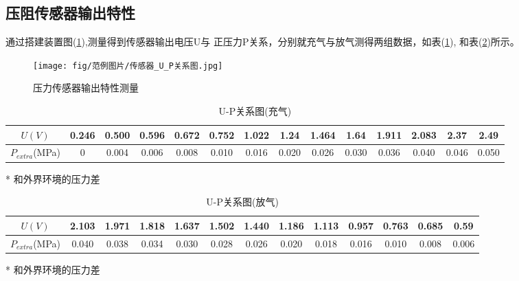 \documentclass[a4paper,UTF8]{ctexart}
\begin{document}
\subsection*{压阻传感器输出特性}
    通过搭建装置图(\ref*{fig:8}),测量得到传感器输出电压U与
正压力P关系，分别就充气与放气测得两组数据，如表(\ref*{table:4}),
和表(\ref*{table:5})所示。
\begin{figure}[!hp]
    \centering
    \texttt{[image: fig/范例图片/传感器\_U\_P关系图.jpg]}
    \caption{压力传感器输出特性测量}
    \label{fig:8}
\end{figure}
\begin{table}[!hp]
    \begin{center}
        \begin{threeparttable}
            \caption{U-P关系图(充气)}
            \begin{tabular}{|c|c|c|c|c|c|c|c|c|c|c|c|c|c|}
                \hline
                $U(V)$&0.246&0.500&0.596&0.672&0.752&1.022&1.24&1.464&1.64&1.911&2.083&2.37&2.49\\
                \hline
                $P_{extra}$\tnote{*}(MPa) &0&0.004&0.006&0.008&0.010&0.016&0.020&0.026&0.030&0.036&0.040&0.046&0.050\\
                \hline
            \end{tabular}
            \label{table:4}
            \begin{tablenotes}
                \footnotesize
                \item[*] 和外界环境的压力差
            \end{tablenotes}
        \end{threeparttable}
    \end{center}
\end{table}
\begin{table}[!hp]
    \begin{center}
        \begin{threeparttable}
            \caption{U-P关系图(放气)}
            \begin{tabular}{|c|c|c|c|c|c|c|c|c|c|c|c|c|}
                \hline
                $U(V)$&2.103&1.971&1.818&1.637&1.502&1.440&1.186&1.113&0.957&0.763&0.685&0.59\\
                \hline
                $P_{extra}$\tnote{*}(MPa) &0.040&0.038&0.034&0.030&0.028&0.026&0.020&0.018&0.016&0.010&0.008&0.006\\
                \hline
            \end{tabular}
            \label{table:5}
            \begin{tablenotes}
                \footnotesize
                \item[*] 和外界环境的压力差
            \end{tablenotes}
        \end{threeparttable}
    \end{center}
\end{table}
\end{document}
